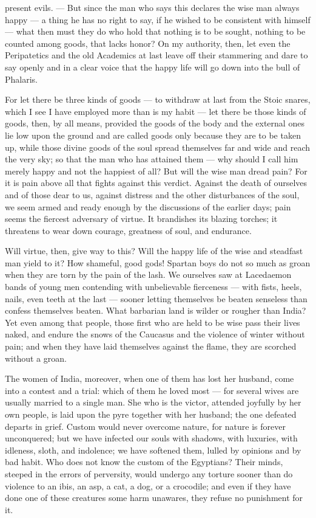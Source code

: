  present evils. — But since the man who says this declares the wise man always happy — a thing he has no right to say, if he wished to be consistent with himself — what then must they do who hold that nothing is to be sought, nothing to be counted among goods, that lacks honor? On my authority, then, let even the Peripatetics and the old Academics at last leave off their stammering and dare to say openly and in a clear voice that the happy life will go down into the bull of Phalaris.

 For let there be three kinds of goods — to withdraw at last from the Stoic snares, which I see I have employed more than is my habit — let there be those kinds of goods, then, by all means, provided the goods of the body and the external ones lie low upon the ground and are called goods only because they are to be taken up, while those divine goods of the soul spread themselves far and wide and reach the very sky; so that the man who has attained them — why should I call him merely happy and not the happiest of all? But will the wise man dread pain? For it is pain above all that fights against this verdict. Against the death of ourselves and of those dear to us, against distress and the other disturbances of the soul, we seem armed and ready enough by the discussions of the earlier days; pain seems the fiercest adversary of virtue. It brandishes its blazing torches; it threatens to wear down courage, greatness of soul, and endurance.

 Will virtue, then, give way to this? Will the happy life of the wise and steadfast man yield to it? How shameful, good gods! Spartan boys do not so much as groan when they are torn by the pain of the lash. We ourselves saw at Lacedaemon bands of young men contending with unbelievable fierceness — with fists, heels, nails, even teeth at the last — sooner letting themselves be beaten senseless than confess themselves beaten. What barbarian land is wilder or rougher than India? Yet even among that people, those first who are held to be wise pass their lives naked, and endure the snows of the Caucasus and the violence of winter without pain; and when they have laid themselves against the flame, they are scorched without a groan.

 The women of India, moreover, when one of them has lost her husband, come into a contest and a trial: which of them he loved most — for several wives are usually married to a single man. She who is the victor, attended joyfully by her own people, is laid upon the pyre together with her husband; the one defeated departs in grief. Custom would never overcome nature, for nature is forever unconquered; but we have infected our souls with shadows, with luxuries, with idleness, sloth, and indolence; we have softened them, lulled by opinions and by bad habit. Who does not know the custom of the Egyptians? Their minds, steeped in the errors of perversity, would undergo any torture sooner than do violence to an ibis, an asp, a cat, a dog, or a crocodile; and even if they have done one of these creatures some harm unawares, they refuse no punishment for it.

